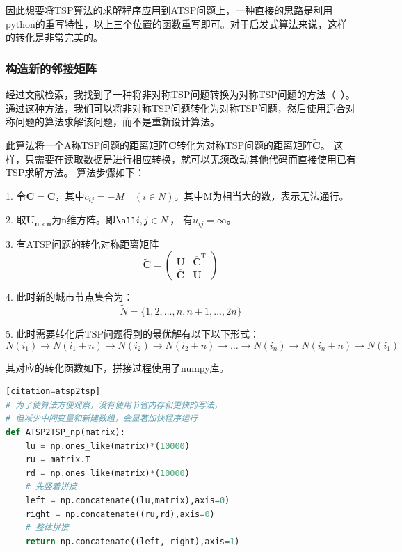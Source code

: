 \documentclass[lang=cn,11pt]{elegantpaper}
\begin{document}
因此想要将TSP算法的求解程序应用到ATSP问题上，一种直接的思路是利用python的重写特性，以上三个位置的函数重写即可。对于启发式算法来说，这样的转化是非常完美的。


\subsubsection{构造新的邻接矩阵}
经过文献检索，我找到了一种将非对称TSP问题转换为对称TSP问题的方法（~\cite{VOLGENANT1983}）。
通过这种方法，我们可以将非对称TSP问题转化为对称TSP问题，然后使用适合对称问题的算法求解该问题，而不是重新设计算法。

此算法将一个A称TSP问题的距离矩阵$\boldsymbol{C}$转化为对称TSP问题的距离矩阵$\tilde{\boldsymbol{C}}$。
这样，只需要在读取数据是进行相应转换，就可以无须改动其他代码而直接使用已有TSP求解方法。
算法步骤如下：

1. 令$\overline{\boldsymbol{C}}=\boldsymbol{C}$，其中$\overline{c_{ij}} = - M \quad(i \in N)$。其中M为相当大的数，表示无法通行。

2. 取$\boldsymbol{U_{n\times n}}$为n维方阵。即$\all i,j \in N $， 有$u_{ij}=\infty$。

3. 有ATSP问题的转化对称距离矩阵
\begin{equation}
\tilde{\boldsymbol{C}}=
    \left(
        \begin{smallmatrix}
        \boldsymbol{U} & \overline{\boldsymbol{C}}^\mathrm{T} \\
        \overline{\boldsymbol{C}} & \boldsymbol{U}
        \end{smallmatrix}
    \right)
\label{eq:binom}
\end{equation}

4. 此时新的城市节点集合为：
\begin{equation}
\tilde{N}=
    \{1,2, \ldots, n, n+1, \ldots, 2 n\}
\label{eq:binom}
\end{equation}


5. 此时需要转化后TSP问题得到的最优解有以下以下形式：
\begin{equation}
N(i_1) \rightarrow N(i_1+n) \rightarrow N(i_2) \rightarrow N(i_2+n) \rightarrow \ldots \rightarrow N(i_n) \rightarrow N(i_n +n) \rightarrow N(i_1) 
\label{eq:binom}
\end{equation}


其对应的转化函数如下，拼接过程使用了numpy库。
\begin{lstlisting}[language=python][citation=atsp2tsp]
# 为了使算法方便观察，没有使用节省内存和更快的写法，
# 但减少中间变量和新建数组，会显著加快程序运行
def ATSP2TSP_np(matrix):
    lu = np.ones_like(matrix)*(10000)
    ru = matrix.T
    rd = np.ones_like(matrix)*(10000)
    # 先竖着拼接
    left = np.concatenate((lu,matrix),axis=0)
    right = np.concatenate((ru,rd),axis=0)
    # 整体拼接
    return np.concatenate((left, right),axis=1)
\end{lstlisting}
\end{document}

